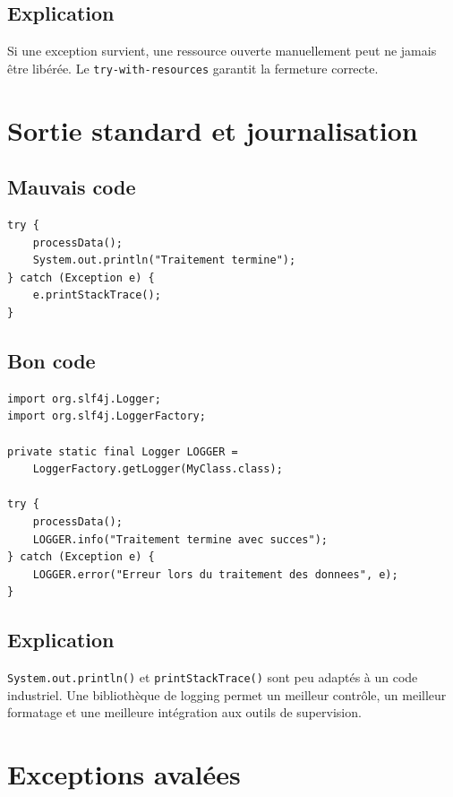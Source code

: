 \documentclass[a4paper,11pt]{report}
\begin{document}
\section{Explication}
Si une exception survient, une ressource ouverte manuellement peut ne jamais être libérée.
Le \texttt{try-with-resources} garantit la fermeture correcte.

\chapter{Sortie standard et journalisation}

\section{Mauvais code}
\begin{lstlisting}
try {
    processData();
    System.out.println("Traitement termine");
} catch (Exception e) {
    e.printStackTrace();
}
\end{lstlisting}

\section{Bon code}
\begin{lstlisting}
import org.slf4j.Logger;
import org.slf4j.LoggerFactory;

private static final Logger LOGGER =
    LoggerFactory.getLogger(MyClass.class);

try {
    processData();
    LOGGER.info("Traitement termine avec succes");
} catch (Exception e) {
    LOGGER.error("Erreur lors du traitement des donnees", e);
}
\end{lstlisting}

\section{Explication}
\texttt{System.out.println()} et \texttt{printStackTrace()} sont peu adaptés à un code industriel.
Une bibliothèque de logging permet un meilleur contrôle, un meilleur formatage et une meilleure intégration aux outils de supervision.

\chapter{Exceptions avalées}
\end{document}

